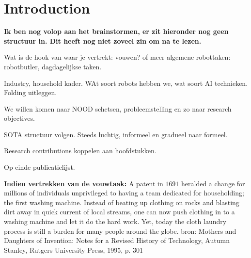 \documentclass[\home/main.tex]{subfiles}
\begin{document}

\chapter{Introduction}\label{ch:introduction}

\textbf{\large{Ik ben nog volop aan het brainstormen, er zit hieronder nog geen structuur in. Dit heeft nog niet zoveel zin om na te lezen.}}

Wat is de hook van waar je vertrekt: vouwen? of meer algemene robottaken: robotbutler, dagdagelijkse taken.

Industry, household kader.
WAt soort robots hebben we, wat soort AI technieken. 
Folding uitleggen. 

We willen komen naar 
    NOOD schetsen, probleemstelling
    en zo naar research objectives. 


SOTA structuur volgen. Steeds luchtig, informeel en gradueel naar formeel.

Research contributions koppelen aan hoofdstukken. 

Op einde publicatielijst. 

\textbf{Indien vertrekken van de vouwtaak:}
A patent in $1691$ heralded a change for millions of individuals unprivileged to having a team dedicated for householding; the first washing machine. Instead of beating up clothing on rocks and blasting dirt away in quick current of local streams, one can now push clothing in to a washing machine and let it do the hard work. Yet, today the cloth laundry process is still a burden for many people around the globe. 
    bron: Mothers and Daughters of Invention: Notes for a Revised History of Technology, Autumn Stanley, Rutgers University Press, 1995, p. 301
\end{document}
